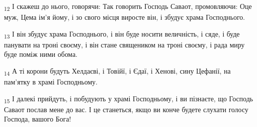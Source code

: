 \begin{tcolorbox}
\textsubscript{12} І скажеш до нього, говорячи: Так говорить Господь Саваот, промовляючи: Оце муж, Цема ім'я йому, і зо свого місця виросте він, і збудує храма Господнього.
\end{tcolorbox}
\begin{tcolorbox}
\textsubscript{13} І він збудує храма Господнього, і він буде носити величність, і сяде, і буде панувати на троні своєму, і він стане священиком на троні своєму, і рада миру буде поміж ними обома.
\end{tcolorbox}
\begin{tcolorbox}
\textsubscript{14} А ті корони будуть Хелдаєві, і Товійї, і Єдаї, і Хенові, сину Цефанії, на пам'ятку в храмі Господньому.
\end{tcolorbox}
\begin{tcolorbox}
\textsubscript{15} І далекі прийдуть, і побудують у храмі Господньому, і ви пізнаєте, що Господь Саваот послав мене до вас. І це станеться, якщо ви конче будете слухати голосу Господа, вашого Бога!
\end{tcolorbox}
